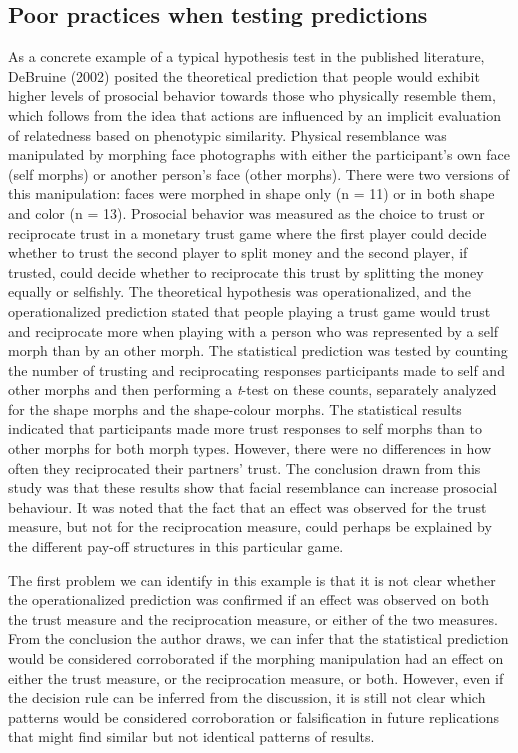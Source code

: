 \documentclass[
  english,
  doc,floatsintext]{apa6}
\begin{document}
\hypertarget{poor-practices-when-testing-predictions}{%
\subsection{Poor practices when testing predictions}\label{poor-practices-when-testing-predictions}}

As a concrete example of a typical hypothesis test in the published literature, DeBruine (2002) posited the theoretical prediction that people would exhibit higher levels of prosocial behavior towards those who physically resemble them, which follows from the idea that actions are influenced by an implicit evaluation of relatedness based on phenotypic similarity. Physical resemblance was manipulated by morphing face photographs with either the participant's own face (self morphs) or another person's face (other morphs). There were two versions of this manipulation: faces were morphed in shape only (n = 11) or in both shape and color (n = 13). Prosocial behavior was measured as the choice to trust or reciprocate trust in a monetary trust game where the first player could decide whether to trust the second player to split money and the second player, if trusted, could decide whether to reciprocate this trust by splitting the money equally or selfishly. The theoretical hypothesis was operationalized, and the operationalized prediction stated that people playing a trust game would trust and reciprocate more when playing with a person who was represented by a self morph than by an other morph. The statistical prediction was tested by counting the number of trusting and reciprocating responses participants made to self and other morphs and then performing a \emph{t}-test on these counts, separately analyzed for the shape morphs and the shape-colour morphs. The statistical results indicated that participants made more trust responses to self morphs than to other morphs for both morph types. However, there were no differences in how often they reciprocated their partners' trust. The conclusion drawn from this study was that these results show that facial resemblance can increase prosocial behaviour. It was noted that the fact that an effect was observed for the trust measure, but not for the reciprocation measure, could perhaps be explained by the different pay-off structures in this particular game.

The first problem we can identify in this example is that it is not clear whether the operationalized prediction was confirmed if an effect was observed on both the trust measure and the reciprocation measure, or either of the two measures. From the conclusion the author draws, we can infer that the statistical prediction would be considered corroborated if the morphing manipulation had an effect on either the trust measure, or the reciprocation measure, or both. However, even if the decision rule can be inferred from the discussion, it is still not clear which patterns would be considered corroboration or falsification in future replications that might find similar but not identical patterns of results.
\end{document}
